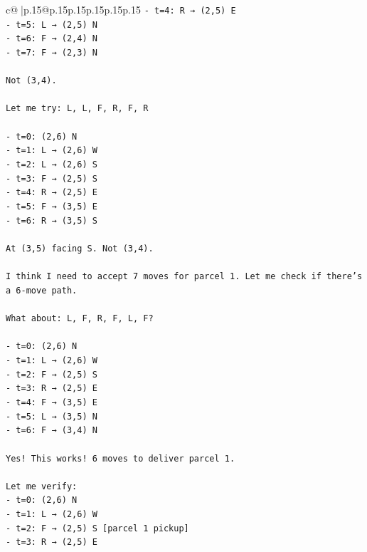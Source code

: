 \documentclass{article}
\begin{document}
{\begin{supertabular}{c@{$\;$}|p{.15\linewidth}@{}p{.15\linewidth}p{.15\linewidth}p{.15\linewidth}p{.15\linewidth}p{.15\linewidth}}
{{{\texttt{{-} t=4: R → (2,5) E} \\
\texttt{{-} t=5: L → (2,5) N} \\
\texttt{{-} t=6: F → (2,4) N} \\
\texttt{{-} t=7: F → (2,3) N} \\
\\ 
\texttt{Not (3,4).} \\
\\ 
\texttt{Let me try: L, L, F, R, F, R} \\
\\ 
\texttt{{-} t=0: (2,6) N} \\
\texttt{{-} t=1: L → (2,6) W} \\
\texttt{{-} t=2: L → (2,6) S} \\
\texttt{{-} t=3: F → (2,5) S} \\
\texttt{{-} t=4: R → (2,5) E} \\
\texttt{{-} t=5: F → (3,5) E} \\
\texttt{{-} t=6: R → (3,5) S} \\
\\ 
\texttt{At (3,5) facing S. Not (3,4).} \\
\\ 
\texttt{I think I need to accept 7 moves for parcel 1. Let me check if there's a 6{-}move path.} \\
\\ 
\texttt{What about: L, F, R, F, L, F?} \\
\\ 
\texttt{{-} t=0: (2,6) N} \\
\texttt{{-} t=1: L → (2,6) W} \\
\texttt{{-} t=2: F → (2,5) S} \\
\texttt{{-} t=3: R → (2,5) E} \\
\texttt{{-} t=4: F → (3,5) E} \\
\texttt{{-} t=5: L → (3,5) N} \\
\texttt{{-} t=6: F → (3,4) N} \\
\\ 
\texttt{Yes! This works! 6 moves to deliver parcel 1.} \\
\\ 
\texttt{Let me verify:} \\
\texttt{{-} t=0: (2,6) N} \\
\texttt{{-} t=1: L → (2,6) W} \\
\texttt{{-} t=2: F → (2,5) S {[}parcel 1 pickup{]}} \\
\texttt{{-} t=3: R → (2,5) E} \\
}}}
\end{supertabular}}
\end{document}
